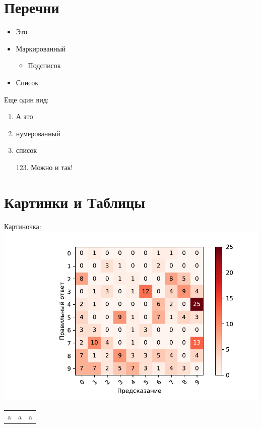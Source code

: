 \documentclass[a4paper, 12pt]{article}
\begin{document}
\section{Перечни}
\begin{itemize} 
    \item Это
    \item Маркированный
    \begin{itemize}
        \item Подсписок
    \end{itemize}
    \item Список
\end{itemize}
Еще один вид:\\
\begin{enumerate}
    \item А это
    \item нумерованный
    \item список
    \item[123.] Можно и так!
\end{enumerate}

\section{Картинки и Таблицы}
Картиночка:
\\
\includegraphics{../conf_matrix_experiment_4.pdf}

\begin{tabular}{c|cc}
    a & a & a
\end{tabular}
\end{document}
